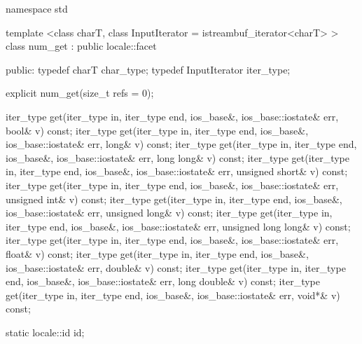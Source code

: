%
\begin{codeblock}
namespace std {
  template <class charT, class InputIterator = istreambuf_iterator<charT> >
  class num_get : public locale::facet {
  public:
    typedef charT            char_type;
    typedef InputIterator    iter_type;

    explicit num_get(size_t refs = 0);

    iter_type get(iter_type in, iter_type end, ios_base&,
                  ios_base::iostate& err, bool& v) const;
    iter_type get(iter_type in, iter_type end, ios_base&,
                  ios_base::iostate& err, long& v) const;
    iter_type get(iter_type in, iter_type end, ios_base&,
                  ios_base::iostate& err, long long& v) const;
    iter_type get(iter_type in, iter_type end, ios_base&,
                  ios_base::iostate& err, unsigned short& v) const;
    iter_type get(iter_type in, iter_type end, ios_base&,
                  ios_base::iostate& err, unsigned int& v) const;
    iter_type get(iter_type in, iter_type end, ios_base&,
                  ios_base::iostate& err, unsigned long& v) const;
    iter_type get(iter_type in, iter_type end, ios_base&,
                  ios_base::iostate& err, unsigned long long& v) const;
    iter_type get(iter_type in, iter_type end, ios_base&,
                  ios_base::iostate& err, float& v) const;
    iter_type get(iter_type in, iter_type end, ios_base&,
                  ios_base::iostate& err, double& v) const;
    iter_type get(iter_type in, iter_type end, ios_base&,
                  ios_base::iostate& err, long double& v) const;
    iter_type get(iter_type in, iter_type end, ios_base&,
                  ios_base::iostate& err, void*& v) const;

    static locale::id id;

}}
\end{codeblock}

